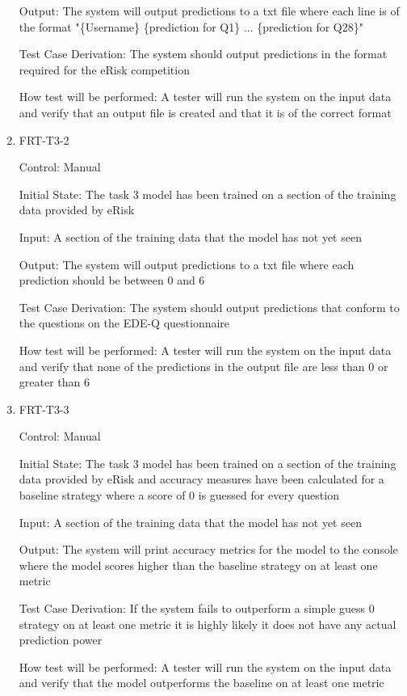 \documentclass[12pt, titlepage]{article}
\begin{document}
\begin{enumerate}
Output: The system will output predictions to a txt file where each line is of the format "\{Username\} \{prediction for Q1\} ... \{prediction for Q28\}"

Test Case Derivation: The system should output predictions in the format required for the eRisk competition

How test will be performed: A tester will run the system on the input data and verify that an output file is created and that it is of the correct format

\item{FRT-T3-2\\}

Control: Manual

Initial State: The task 3 model has been trained on a section of the training data provided by eRisk

Input: A section of the training data that the model has not yet seen

Output: The system will output predictions to a txt file where each prediction should be between 0 and 6

Test Case Derivation: The system should output predictions that conform to the questions on the EDE-Q questionnaire

How test will be performed: A tester will run the system on the input data and verify that none of the predictions in the output file are less than 0 or greater than 6

\item{FRT-T3-3\\}

Control: Manual

Initial State: The task 3 model has been trained on a section of the training data provided by eRisk and accuracy measures have been calculated for a baseline strategy where a score of 0 is guessed for every question

Input: A section of the training data that the model has not yet seen

Output: The system will print accuracy metrics for the model to the console where the model scores higher than the baseline strategy on at least one metric

Test Case Derivation: If the system fails to outperform a simple guess 0 strategy on at least one metric it is highly likely it does not have any actual prediction power

How test will be performed: A tester will run the system on the input data and verify that the model outperforms the baseline on at least one metric


\end{enumerate}
\end{document}
